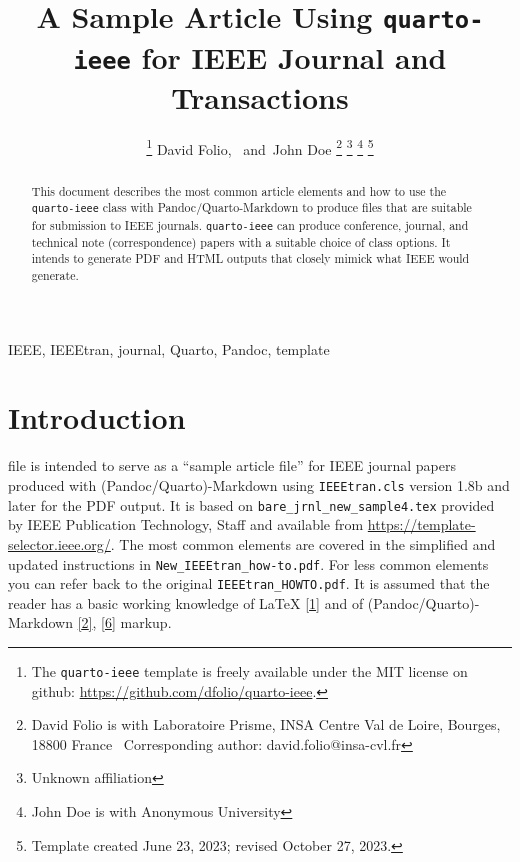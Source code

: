 \documentclass[
  journal,
]{IEEEtran}%
\title{A Sample Article Using \texttt{quarto-ieee} for IEEE Journal and
Transactions}
\author{
\thanks{The \texttt{quarto-ieee} template is freely available under the
MIT license on github: \url{https://github.com/dfolio/quarto-ieee}.}
David Folio\orcidlink{0000-0001-9430-6091},~\IEEEmembership{Member,
IEEE}
and~John Doe%
\thanks{David Folio is with Laboratoire Prisme, INSA Centre Val de
Loire, Bourges, 18800 France%
  Corresponding author: david.folio@insa-cvl.fr
}
\thanks{Unknown affiliation}
\thanks{John Doe is with Anonymous University%
}
\thanks{Template created June 23, 2023; revised October 27, 2023.}
}
\theoremstyle{plain}
\theoremstyle{remark}
\begin{document}


\maketitle

\begin{abstract}
This document describes the most common article elements and how to use
the \texttt{quarto-ieee} class with Pandoc/Quarto-Markdown to produce
files that are suitable for submission to IEEE journals.
\texttt{quarto-ieee} can produce conference, journal, and technical note
(correspondence) papers with a suitable choice of class options. It
intends to generate PDF and HTML outputs that closely mimick what IEEE
would generate.
\end{abstract}
\begin{IEEEkeywords}
IEEE, IEEEtran, journal, Quarto, Pandoc, template
\end{IEEEkeywords}

%

\ifdefined\Shaded\renewenvironment{Shaded}{\begin{tcolorbox}[boxrule=0pt, sharp corners, interior hidden, borderline west={3pt}{0pt}{shadecolor}, frame hidden, breakable, enhanced]}{\end{tcolorbox}}\fi

\hypertarget{sec-intro}{%
\section{Introduction}\label{sec-intro}}

 file is intended to serve as a ``sample article
file'' for IEEE journal papers produced with (Pandoc/Quarto)-Markdown
using \texttt{IEEEtran.cls} version 1.8b and later for the PDF output.
It is based on \texttt{bare\_jrnl\_new\_sample4.tex} provided by IEEE
Publication Technology, Staff and available from
\url{https://template-selector.ieee.org/}. The most common elements are
covered in the simplified and updated instructions in
\texttt{New\_IEEEtran\_how-to.pdf}. For less common elements you can
refer back to the original \texttt{IEEEtran\_HOWTO.pdf}. It is assumed
that the reader has a basic working knowledge of {\LaTeX}
\protect\hyperlink{ref-mittelbach2023latex}{{[}1{]}} and of
(Pandoc/Quarto)-Markdown
\protect\hyperlink{ref-Allaire_Quarto_2022}{{[}2{]}},
\protect\hyperlink{ref-MacFarlane_Pandoc}{{[}6{]}} markup.
\end{document}
